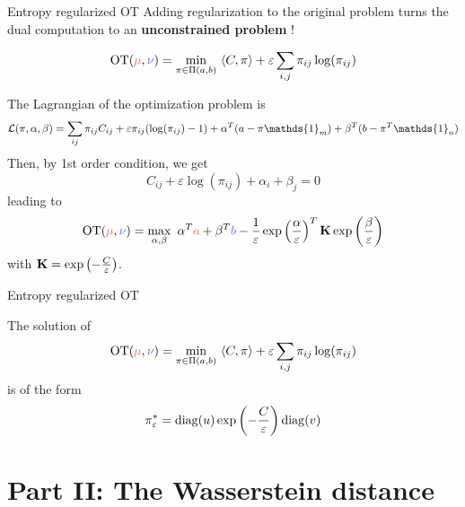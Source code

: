\documentclass[pdf,aspectratio=169,10pt]{beamer}
\begin{document}
\begin{frame}{Entropy regularized OT \cite{sinkhorn_lightspeed}}
Adding regularization to the original problem turns the dual computation to an \textbf{unconstrained problem} !

$$\OT(\er{\mu},\eb{\nu}) = \min_{\pi\in\Pi(a,b)} \ \langle C,\pi\rangle + \varepsilon \sum_{i,j} \pi_{ij}\log(\pi_{ij})$$

The Lagrangian of the optimization problem is 
$$\LL(\pi,\alpha,\beta) = \sum_{ij}\pi_{ij}C_{ij} + \varepsilon \pi_{ij}(\log(\pi_{ij})-1) + \alpha^T(a-\pi\mathds{1}_m) + \beta^T(b-\pi^T\mathds{1}_n)$$
Then, by 1st order condition, we get
$$C_{ij} +\varepsilon\log(\pi_{ij})+\alpha_i + \beta_j= 0$$
leading to 
$$\OT(\er{\mu},\eb{\nu}) = \max_{\alpha,\beta} \ \alpha^T\er{a} + \beta^T\eb{b} -\frac{1}{\varepsilon}\exp\left(\frac{\alpha}{\varepsilon}\right)^T \K\exp\left(\frac{\beta}{\varepsilon}\right)$$
with ${\mathbf{K}} = \exp\left(-\frac{C}{\varepsilon}\right)$.
\end{frame}


\begin{frame}{Entropy regularized OT \cite{cuturi2013fast}}
\begin{block}{}
The solution of 
$$\OT(\er{\mu},\eb{\nu}) = \min_{\pi\in\Pi(a,b)} \ \langle C,\pi\rangle + \varepsilon \sum_{i,j} \pi_{ij}\log(\pi_{ij})$$
is of the form
$$\pi_\varepsilon^* = \mathop{\rm diag}\nolimits(u)\exp\left(-\frac{C}{\varepsilon}\right)\mathop{\rm diag}\nolimits(v)$$
\end{block}

\end{frame}






\section{Part II: The Wasserstein distance}



\begin{frame}
    \Large {}
\end{frame}
\end{document}

